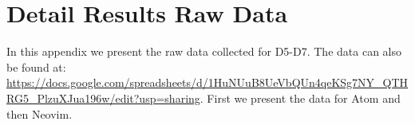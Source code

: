 \section{Detail Results Raw Data}
\label{ap:raw_detailed_data}
In this appendix we present the raw data collected for D5-D7. The data can also be found at: \url{https://docs.google.com/spreadsheets/d/1HuNUuB8UeVbQUn4qeKSg7NY_QTHRG5_PlzuXJua196w/edit?usp=sharing}. First we present the data for Atom and then Neovim.


